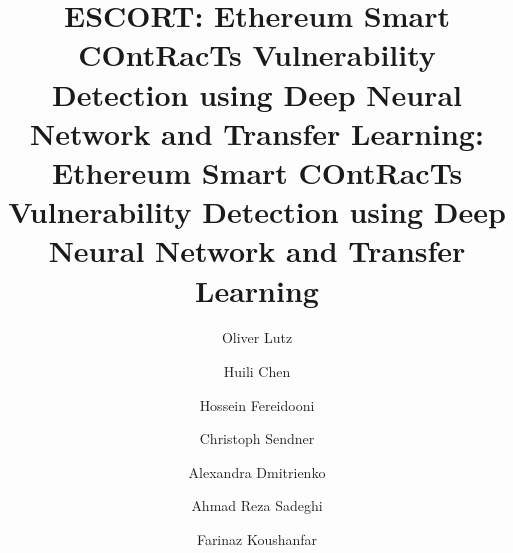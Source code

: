 \title{ESCORT: Ethereum Smart COntRacTs Vulnerability Detection using Deep Neural Network and Transfer Learning}



\title{\sys{}: Ethereum Smart COntRacTs Vulnerability Detection using Deep Neural Network and Transfer Learning}

\ifanonymous
\author{}
\else
\author{Oliver Lutz}

\author{Huili Chen}

\author{Hossein Fereidooni}

\author{Christoph Sendner}

\author{Alexandra Dmitrienko}

\author{Ahmad Reza Sadeghi}

\author{Farinaz Koushanfar}

\thispagestyle{plain}
\pagestyle{plain}

